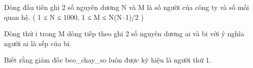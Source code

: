 Dòng đầu tiên ghi 2 số nguyên dương N và M là số người của công ty và số mối quan hệ. ( 1 ≤ N ≤ 1000, 1 ≤ M ≤ N(N–1)/2 )  

   Dòng thứ i trong M dòng tiếp theo ghi 2 số nguyên dương ai và bi với ý nghĩa người ai là sếp của bi.  

   Biết rằng giám đốc beo\_chay\_so luôn được ký hiệu là người thứ 1.  

\